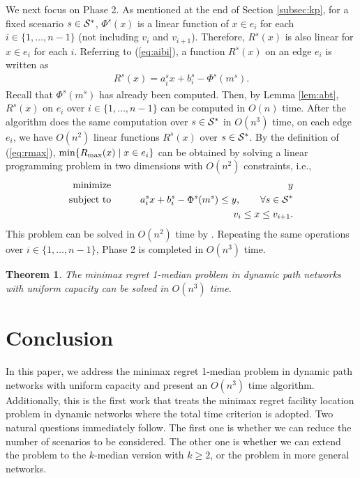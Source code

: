 \documentclass[a4paper]{llncs}
\newtheorem{thm}{Theorem}
\begin{document}
We next focus on Phase 2. 
As mentioned at the end of Section \ref{subsec:kp}, 
for a fixed scenario $s \in {\cal S}^*$, 
$\Phi^s(x)$ is a linear function of $x \in e_i$ for each $i \in \{1, \ldots, n-1\}$ (not including $v_i$ and $v_{i+1}$).
Therefore, $R^s(x)$ is also linear for $x \in e_i$ for each $i$.
Referring to (\ref{eq:aibi}), a function $R^s(x)$ on an edge $e_i$ is written as
\begin{eqnarray}
R^s(x) = a^s_ix + b^s_i - \Phi^s(m^s).
\label{eq:aibi2}
\end{eqnarray}
Recall that $\Phi^s(m^s)$ has already been computed.
Then, by Lemma \ref{lem:abt}, $R^s(x)$ on $e_i$ over $i \in \{1, \ldots, n-1\}$ can be computed in $O(n)$ time.
After the algorithm does the same computation over $s \in {\cal S}^*$ in $O(n^3)$ time,
on each edge $e_i$,
we have $O(n^2)$ linear functions $R^s(x)$ over $s \in {\cal S}^*$.
By the definition of (\ref{eq:rmax}), $\min\{R_{\rm max}(x) \mid x \in e_i\}$ can be obtained by solving a linear programming problem in two dimensions with $O(n^2)$ constraints,
i.e.,
\begin{eqnarray}
\mbox{minimize}	& \ \ \ \ \ \	& y 													\notag \\
\mbox{subject to} 	& 		& a^s_ix + b^s_i - \Phi^s(m^s) \le y, \ \ \ \ \ \ \forall s \in {\cal S}^*	\notag \\
				&		& v_i \le x \le v_{i+1}.										\notag
\end{eqnarray}
This problem can be solved in $O(n^2)$ time by \cite{d84}.
Repeating the same operations over $i \in \{1, \ldots, n-1\}$, Phase 2 is completed in $O(n^3)$ time.

\begin{thm}
The minimax regret 1-median problem in dynamic path networks with uniform capacity can be solved in $O(n^3)$ time.
\label{thm:1}
\end{thm}

\section{Conclusion}
\label{sec:co}
In this paper, we address the minimax regret 1-median problem in dynamic path networks with uniform capacity and present an $O(n^3)$ time algorithm. 
Additionally, this is the first work that treats the minimax regret facility location problem in dynamic networks where the total time criterion is adopted.
Two natural questions immediately follow.
The first one is whether we can reduce the number of scenarios to be considered.
The other one is whether we can extend the problem to the $k$-median version with $k \ge 2$,
or the problem in more general networks.  
\end{document}
